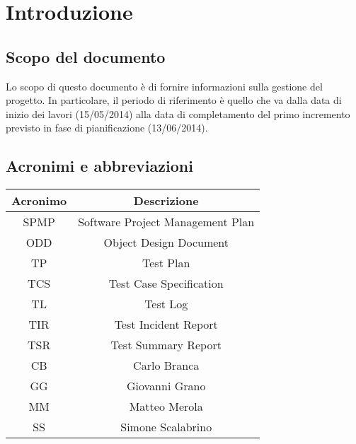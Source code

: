 \chapter{Introduzione}
\section{Scopo del documento}
Lo scopo di questo documento è di fornire informazioni sulla gestione del progetto. In particolare, il periodo di riferimento è quello che va dalla data di inizio dei lavori (15/05/2014) alla data di completamento del primo incremento previsto in fase di pianificazione (13/06/2014).

\section{Acronimi e abbreviazioni}
\begin{table}[ht]
\centering
\begin{tabular}{|c|c|}
 \hline
 \rowcolor{Gray}\textbf{Acronimo}			& \textbf{Descrizione}				\\
 \hline
 SPMP							& Software Project Management Plan		\\
 \hline
 ODD							& Object Design Document			\\
 \hline
 TP							& Test Plan					\\
 \hline
 TCS							& Test Case Specification			\\
 \hline
 TL							& Test Log					\\
 \hline
 TIR							& Test Incident Report				\\
 \hline
 TSR							& Test Summary Report				\\
 \hline
 CB							& Carlo Branca					\\
 \hline
 GG							& Giovanni Grano				\\
 \hline
 MM							& Matteo Merola					\\
 \hline
 SS							& Simone Scalabrino				\\
 \hline
\end{tabular}
\end{table}